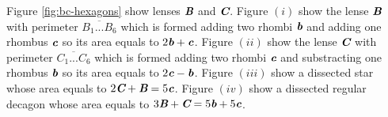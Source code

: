 \documentclass[11pt]{article}
\def\mathbi#1{\textbf{\em #1}}
\begin{document}
Figure \ref{fig:bc-hexagons} show lenses $\mathbi{B}$ and $\mathbi{C}$.
Figure $(i)$ show the lense $\mathbi{B}$ with perimeter $\overline{B_1...B_6}$ which is formed adding two rhombi $\mathbi{b}$ and adding one rhombus $\mathbi{c}$ so its area equals to $2\mathbi{b} + \mathbi{c}$.
Figure $(ii)$ show the lense $\mathbi{C}$ with perimeter $\overline{C_1...C_6}$ which is formed adding two rhombi $\mathbi{c}$ and substracting one rhombus $\mathbi{b}$ so its area equals to $2\mathbi{c} - \mathbi{b}$.
Figure $(iii)$ show a dissected star whose area equals to $2\mathbi{C} + \mathbi{B} = 5\mathbi{c}$.
Figure $(iv)$ show a dissected regular decagon whose area equals to $3\mathbi{B} + \mathbi{C} = 5\mathbi{b} + 5\mathbi{c}$.
\end{document}
